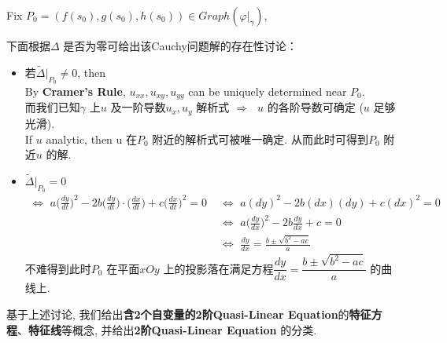 	\vspace*{4em}
	
	\hspace*{-1.85em}Fix $P_0 = (f(s_0) , g(s_0) , h(s_0)) \in Graph(\varphi|_{\gamma})$, 
	
	\vspace*{2em}
	
	\hspace*{-1.85em}下面根据$\Delta$ 是否为零可给出该Cauchy问题解的存在性讨论：
	
	\newpage
	
	\begin{itemize}
		\item 若$\widetilde{\Delta}|_{P_0} \neq 0$, then \\
		By \textbf{Cramer's Rule}, $u_{xx} , u_{xy} , u_{yy}$ can be uniquely determined near $P_0$. \\
		而我们已知$\gamma$ 上$u$ 及一阶导数$u_x , u_y$ 解析式$\,\, \Rightarrow \,\,$ $u$ 的各阶导数可确定 ($u$ 足够光滑). \\
		If $u$ analytic, then u 在$P_0$ 附近的解析式可被唯一确定. 从而此时可得到$P_0$ 附近$u$ 的解. 
		
		\vspace*{2em}
		
		\item $\widetilde{\Delta}|_{P_0} = 0$ 
		\begin{align*}
			\Leftrightarrow \,\, a \Big( \frac{dy}{dt} \Big)^2 - 2b \Big( \frac{dy}{dt} \Big) \cdot \Big( \frac{dx}{dt} \Big) + c \Big( \frac{dx}{dt} \Big)^2 = 0 \,\, 
			&\Leftrightarrow \,\, a(dy)^2 - 2b(dx)(dy) + c(dx)^2 = 0 \\
			&\Leftrightarrow \,\, a \Big( \frac{dy}{dx} \Big)^2 - 2b \frac{dy}{dx} + c = 0 \\
			&\Leftrightarrow \,\, \frac{dy}{dx} = \frac{b \pm \sqrt{b^2 - ac}}{a}
		\end{align*}
		不难得到此时$P_0$ 在平面$xOy$ 上的投影落在满足方程$\dfrac{dy}{dx} = \dfrac{b \pm \sqrt{b^2 - ac}}{a}$ 的曲线上. 
	\end{itemize}
	
	\vspace*{4em}
	
	\hspace*{-1.85em}基于上述讨论, 我们给出\textbf{含2个自变量的2阶Quasi-Linear Equation}的\textbf{特征方程}、\textbf{特征线}等概念, 并给出\textbf{2阶Quasi-Linear Equation} 的分类. 
	
	\vspace*{3em}
	
